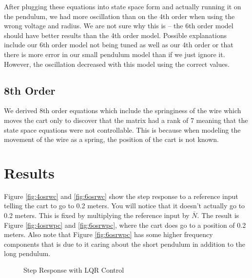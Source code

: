 \documentclass{article}
\begin{document}
After plugging these equations into state space form and actually running it on the pendulum, we had more oscillation than on the 4th order when using the wrong voltage and radius. We are not sure why this is -- the 6th order model should have better results than the 4th order model. Possible explanations include our 6th order model not being tuned as well as our 4th order or that there is more error in our small pendulum model than if we just ignore it. However, the oscillation decreased with this model using the correct values.

\subsection{8th Order}
We derived 8th order equations which include the springiness of the wire which moves the cart only to discover that the matrix had a rank of 7 meaning that the state space equations were not controllable. This is because when modeling the movement of the wire as a spring, the position of the cart is not known. 

\section{Results}

Figure \ref{fig:4osrwc} and \ref{fig:6osrwc} show the step response to a reference input telling the cart to go to 0.2 meters. You will notice that it doesn't actually go to 0.2 meters. This is fixed by multiplying the reference input by $\bar{N}$. The result is Figure \ref{fig:4osrwpc} and \ref{fig:6osrwpc}, where the cart does go to a position of 0.2 meters. Also note that Figure \ref{fig:6osrwpc} has some higher frequency components that is due to it caring about the short pendulum in addition to the long pendulum.

\begin{figure}
\centering
{}
\caption{Step Response with LQR Control}
\end{figure}
\end{document}
